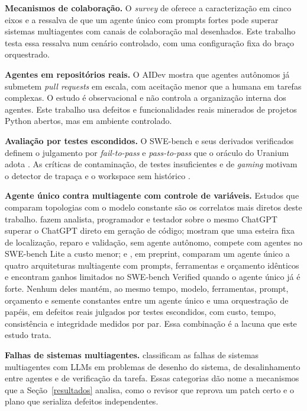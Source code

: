 \textbf{Mecanismos de colaboração.} O \textit{survey} de \cite{SurveyLLMs2025} oferece a caracterização em cinco eixos e a ressalva de que um agente único com prompts fortes pode superar sistemas multiagentes com canais de colaboração mal desenhados. Este trabalho testa essa ressalva num cenário controlado, com uma configuração fixa do braço orquestrado.

\textbf{Agentes em repositórios reais.} O AIDev \citep{AIDEV2025} mostra que agentes autônomos já submetem \textit{pull requests} em escala, com aceitação menor que a humana em tarefas complexas. O estudo é observacional e não controla a organização interna dos agentes. Este trabalho usa defeitos e funcionalidades reais minerados de projetos Python abertos, mas em ambiente controlado.

\textbf{Avaliação por testes escondidos.} O SWE-bench e seus derivados verificados definem o julgamento por \textit{fail-to-pass} e \textit{pass-to-pass} que o oráculo do Uranium adota \citep{Jimenez2024SWEbench, OpenAI2024SWEbenchVerified}. As críticas de contaminação, de testes insuficientes e de \textit{gaming} motivam o detector de trapaça e o workspace sem histórico \citep{Jain2025LiveCodeBench, Yu2025UTBoost, Zhong2026ImpossibleBench}.

\textbf{Agente único contra multiagente com controle de variáveis.} Estudos que comparam topologias com o modelo constante são os correlatos mais diretos deste trabalho. \cite{Dong2024SelfCollaboration} fazem analista, programador e testador sobre o mesmo ChatGPT superar o ChatGPT direto em geração de código; \cite{Xia2025Agentless} mostram que uma esteira fixa de localização, reparo e validação, sem agente autônomo, compete com agentes no SWE-bench Lite a custo menor; e \cite{Kim2025ScalingAgentSystems}, em preprint, comparam um agente único a quatro arquiteturas multiagente com prompts, ferramentas e orçamento idênticos e encontram ganhos limitados no SWE-bench Verified quando o agente único já é forte. Nenhum deles mantém, ao mesmo tempo, modelo, ferramentas, prompt, orçamento e semente constantes entre um agente único e uma orquestração de papéis, em defeitos reais julgados por testes escondidos, com custo, tempo, consistência e integridade medidos por par. Essa combinação é a lacuna que este estudo trata.

\textbf{Falhas de sistemas multiagentes.} \cite{Cemri2025MAST} classificam as falhas de sistemas multiagentes com LLMs em problemas de desenho do sistema, de desalinhamento entre agentes e de verificação da tarefa. Essas categorias dão nome a mecanismos que a Seção~\ref{resultados} analisa, como o revisor que reprova um patch certo e o plano que serializa defeitos independentes.


